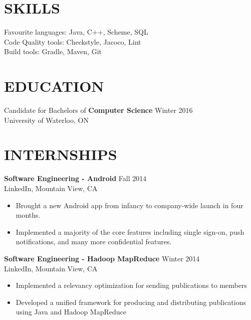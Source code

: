 \documentclass[margin]{res}
\begin{document}
 


 
 
\address{cckroets@uwaterloo.ca \\ 4A Computer Science \\ID: 20410933}
\address{
	\href{http://www.github.com/cckroets}	{\sf \bf github.com/cckroets} \\ 
	\href{http://linkd.in/1yeGzGo}			{\sf \bf linkd.in/1yeGzGo} 
}


 
\begin{resume} 

\section{SKILLS} 
Favourite languages: Java, C++, Scheme, SQL \\
Code Quality tools: Checkstyle, Jacoco, Lint \\
Build tools: Gradle, Maven, Git 

\section{EDUCATION} 
Candidate for Bachelors of {\bf Computer Science} \hfill Winter 2016 \\
University of Waterloo, ON  

\section{INTERNSHIPS}
{\bf Software Engineering - Android} \hfill Fall 2014 \\ LinkedIn, Mountain View, CA
 \begin{itemize} \itemsep -2pt  %
 \item Brought a new Android app from infancy to company-wide launch in four months.
 \item {\mbox Implemented a majority of the core features including single sign-on, push notifications, and many more confidential features.}
\end{itemize}

 {\bf Software Engineering - Hadoop MapReduce} \hfill Winter 2014 \\ LinkedIn, Mountain View, CA 
 \begin{itemize} \itemsep -2pt  %
 \item Implemented a relevancy optimization for sending publications to members
 \item {\mbox Developed a unified framework for producing and distributing publications using Java and Hadoop MapReduce}	
\end{itemize}
 

\end{resume}
\end{document}
